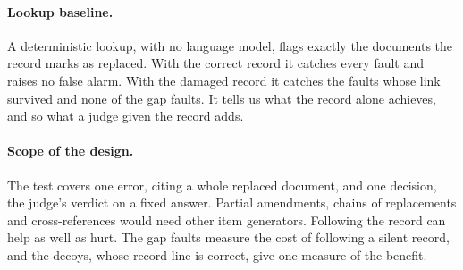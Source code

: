 \paragraph{Lookup baseline.}
A deterministic lookup, with no language model, flags exactly the documents the record marks as replaced. With the
correct record it catches every fault and raises no false alarm. With the damaged record it catches the faults whose
link survived and none of the gap faults. It tells us what the record alone achieves, and so what a judge given the
record adds.

\paragraph{Scope of the design.}
The test covers one error, citing a whole replaced document, and one decision, the judge's verdict on a fixed answer.
Partial amendments, chains of replacements and cross-references would need other item generators. Following the record
can help as well as hurt. The gap faults measure the cost of following a silent record, and the decoys, whose record
line is correct, give one measure of the benefit.
